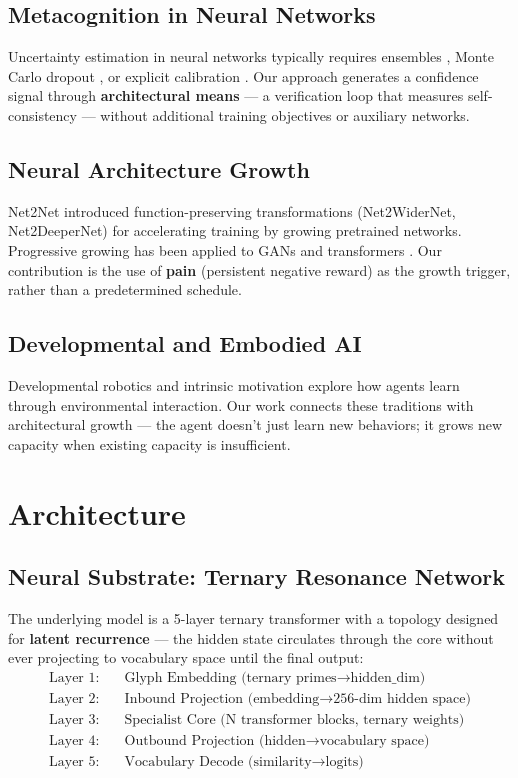 \documentclass{article}
\begin{document}
\subsection{Metacognition in Neural Networks}
Uncertainty estimation in neural networks typically requires ensembles \cite{lakshminarayanan2017simple}, Monte Carlo dropout \cite{gal2016dropout}, or explicit calibration \cite{guo2017calibration}. Our approach generates a confidence signal through \textbf{architectural means} --- a verification loop that measures self-consistency --- without additional training objectives or auxiliary networks.

\subsection{Neural Architecture Growth}
Net2Net \cite{chen2015net2net} introduced function-preserving transformations (Net2WiderNet, Net2DeeperNet) for accelerating training by growing pretrained networks. Progressive growing has been applied to GANs \cite{karras2018progressive} and transformers \cite{dai2019transformerxl}. Our contribution is the use of \textbf{pain} (persistent negative reward) as the growth trigger, rather than a predetermined schedule.

\subsection{Developmental and Embodied AI}
Developmental robotics \cite{lungarella2003developmental} and intrinsic motivation \cite{oudeyer2007intrinsic} explore how agents learn through environmental interaction. Our work connects these traditions with architectural growth --- the agent doesn't just learn new behaviors; it grows new capacity when existing capacity is insufficient.

\section{Architecture}

\subsection{Neural Substrate: Ternary Resonance Network}

The underlying model is a 5-layer ternary transformer with a topology designed for \textbf{latent recurrence} --- the hidden state circulates through the core without ever projecting to vocabulary space until the final output:
\begin{align*}
\text{Layer 1:} & \quad \text{Glyph Embedding (ternary primes} \rightarrow \text{hidden\_dim)} \\
\text{Layer 2:} & \quad \text{Inbound Projection (embedding} \rightarrow \text{256-dim hidden space)} \\
\text{Layer 3:} & \quad \text{Specialist Core (N transformer blocks, ternary weights)} \\
\text{Layer 4:} & \quad \text{Outbound Projection (hidden} \rightarrow \text{vocabulary space)} \\
\text{Layer 5:} & \quad \text{Vocabulary Decode (similarity} \rightarrow \text{logits)}
\end{align*}
\end{document}
